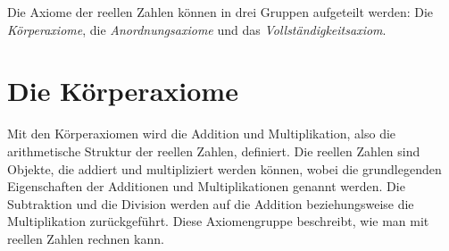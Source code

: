 \documentclass[fontsize=9pt,
               parskip=half-,
               DIV=14,
               listof=chapterentry,
               tocflat]{scrbook}
\begin{document}
Die Axiome der reellen Zahlen können in drei Gruppen aufgeteilt werden: Die \emph{Körperaxiome}, die \emph{Anordnungsaxiome} und das \emph{Vollständigkeitsaxiom}.

\section{Die Körperaxiome}

Mit den Körperaxiomen wird die Addition und Multiplikation, also die arithmetische Struktur der reellen Zahlen, definiert. Die reellen Zahlen sind Objekte, die addiert und multipliziert werden können, wobei die grundlegenden Eigenschaften der Additionen und Multiplikationen genannt werden. Die Subtraktion und die Division werden auf die Addition beziehungsweise die Multiplikation zurückgeführt. Diese Axiomengruppe beschreibt, wie man mit reellen Zahlen rechnen kann.
\end{document}
